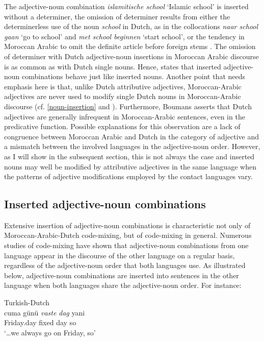 \noindent The adjective-noun combination \textit{islamitische school} `Islamic school' is inserted without a determiner, the omission of determiner results from either the determinerless use of the noun \textit{school} in Dutch, as in the collocations \textit{naar school gaan} `go to school' and \textit{met school beginnen} `start school', or the tendency in Moroccan Arabic to omit the definite article before foreign stems \citep[cf.][187]{boumans-syntax-1998}. The omission of determiner with Dutch adjective-noun insertions in Moroccan Arabic discourse is as common as with Dutch single nouns. Hence, \citet[205]{boumans-syntax-1998} states that inserted adjective-noun combinations behave just like inserted nouns. Another point that needs emphasis here is that, unlike Dutch attributive adjectives, Moroccan-Arabic adjectives are never used to modify single Dutch nouns in Moroccan-Arabic discourse (cf. \ref{noun-insertion} and \citealt[][201]{boumans-syntax-1998}). Furthermore, Boumans asserts that Dutch adjectives are generally infrequent in Moroccan-Arabic sentences, even in the predicative function. Possible explanations for this observation are a lack of congruence between Moroccan Arabic and Dutch in the category of adjective and a mismatch between the involved languages in the adjective-noun order. However, as I will show in the subsequent section, this is not always the case and inserted nouns may well be modified by attributive adjectives in the same language when the patterns of adjective modifications employed by the contact languages vary.

\subsection{Inserted adjective-noun combinations}
Extensive insertion of adjective-noun combinations is characteristic not only of Moroccan-Arabic-Dutch code-mixing, but of code-mixing in general. Numerous studies of code-mixing have shown that adjective-noun combinations from one language appear in the discourse of the other language on a regular basis, regardless of the adjective-noun order that both languages use. As illustrated below, adjective-noun combinations are inserted into sentences in the other language when both languages share the adjective-noun order. For instance:

\ea{\label{ex:4:4}}
Turkish-Dutch \citep[177]{backus-two-1996}\\
\gll {\dots} {cuma günü} \textit{vaste} \textit{dag} yani\\
    {} {Friday.day} fixed day so\\
\glt `\dots we always go on Friday, so' 
\z

